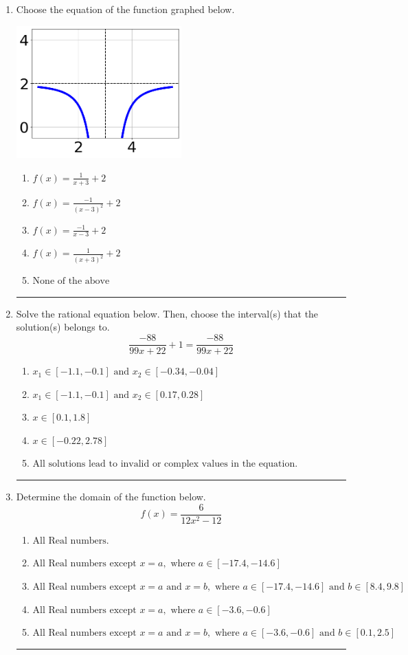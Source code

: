 \documentclass[14pt]{extbook}
\newcommand{\litem}[1]{\item#1\hspace*{-1cm}\rule{\textwidth}{0.4pt}}
\begin{document}
\begin{enumerate}
\litem{
Choose the equation of the function graphed below.
\begin{center}
    \includegraphics[width=0.5\textwidth]{../Figures/rationalGraphToEquationCopyA.png}
\end{center}
\begin{enumerate}[label=\Alph*.]
\item \( f(x) = \frac{1}{x + 3} + 2 \)
\item \( f(x) = \frac{-1}{(x - 3)^2} + 2 \)
\item \( f(x) = \frac{-1}{x - 3} + 2 \)
\item \( f(x) = \frac{1}{(x + 3)^2} + 2 \)
\item \( \text{None of the above} \)

\end{enumerate} }
\litem{
Solve the rational equation below. Then, choose the interval(s) that the solution(s) belongs to.\[ \frac{-88}{99x + 22} + 1 = \frac{-88}{99x + 22} \]\begin{enumerate}[label=\Alph*.]
\item \( x_1 \in [-1.1, -0.1] \text{ and } x_2 \in [-0.34,-0.04] \)
\item \( x_1 \in [-1.1, -0.1] \text{ and } x_2 \in [0.17,0.28] \)
\item \( x \in [0.1,1.8] \)
\item \( x \in [-0.22,2.78] \)
\item \( \text{All solutions lead to invalid or complex values in the equation.} \)

\end{enumerate} }
\litem{
Determine the domain of the function below.\[ f(x) = \frac{6}{12x^{2} -12} \]\begin{enumerate}[label=\Alph*.]
\item \( \text{All Real numbers.} \)
\item \( \text{All Real numbers except } x = a, \text{ where } a \in [-17.4, -14.6] \)
\item \( \text{All Real numbers except } x = a \text{ and } x = b, \text{ where } a \in [-17.4, -14.6] \text{ and } b \in [8.4, 9.8] \)
\item \( \text{All Real numbers except } x = a, \text{ where } a \in [-3.6, -0.6] \)
\item \( \text{All Real numbers except } x = a \text{ and } x = b, \text{ where } a \in [-3.6, -0.6] \text{ and } b \in [0.1, 2.5] \)


\end{enumerate}}
\end{enumerate}
\end{document}
